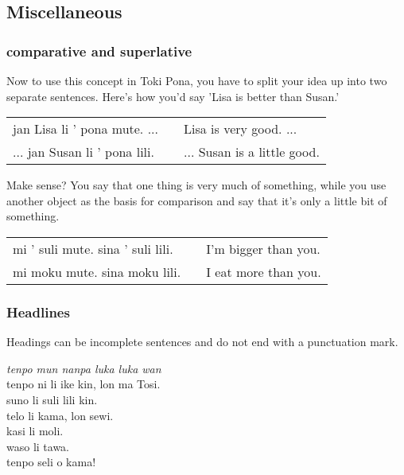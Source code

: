 %
\subsection*{Miscellaneous}
%
%
\subsubsection*{comparative and superlative} 
%
%
Now to use this concept in Toki Pona, you have to split your idea up into two separate sentences. 
Here's how you'd say 'Lisa is better than Susan.'

\begin{supertabular}{p{5,5cm}|ll}
jan Lisa li ' pona mute. ...  && Lisa is very good. ... \\ %
... jan Susan li ' pona lili. && ... Susan is a little good. \\ %
\end{supertabular} 

Make sense? 
You say that one thing is very much of something, while you use another object as the basis for comparison and say that it's only a little bit of something. 

\begin{supertabular}{p{5,5cm}|ll}
mi ' suli mute. sina ' suli lili. && I'm bigger than you. \\
mi moku mute. sina moku lili. && I eat more than you. \\
\end{supertabular} 

%
%
\subsubsection*{Headlines} 
%
%
Headings can be incomplete sentences and do not end with a punctuation mark.

\textit{tenpo mun nanpa luka luka wan} \\
tenpo ni li ike kin, lon ma Tosi. \\
suno li suli lili kin. \\ 
telo li kama, lon sewi. \\
kasi li moli. \\
waso li tawa. \\
tenpo seli o kama! 

